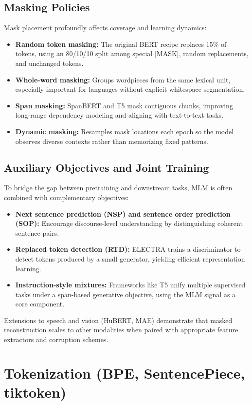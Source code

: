 \documentclass{article}
\begin{document}
\subsection{Masking Policies}
Mask placement profoundly affects coverage and learning dynamics:
\begin{itemize}
  \item \textbf{Random token masking:} The original BERT recipe replaces 15\% of tokens, using an 80/10/10 split among special [MASK], random replacements, and unchanged tokens.
  \item \textbf{Whole-word masking:} Groups wordpieces from the same lexical unit, especially important for languages without explicit whitespace segmentation.
  \item \textbf{Span masking:} SpanBERT and T5 mask contiguous chunks, improving long-range dependency modeling and aligning with text-to-text tasks.
  \item \textbf{Dynamic masking:} Resamples mask locations each epoch so the model observes diverse contexts rather than memorizing fixed patterns.
\end{itemize}

\subsection{Auxiliary Objectives and Joint Training}
To bridge the gap between pretraining and downstream tasks, MLM is often combined with complementary objectives:
\begin{itemize}
  \item \textbf{Next sentence prediction (NSP) and sentence order prediction (SOP):} Encourage discourse-level understanding by distinguishing coherent sentence pairs.
  \item \textbf{Replaced token detection (RTD):} ELECTRA trains a discriminator to detect tokens produced by a small generator, yielding efficient representation learning.
  \item \textbf{Instruction-style mixtures:} Frameworks like T5 unify multiple supervised tasks under a span-based generative objective, using the MLM signal as a core component.
\end{itemize}
Extensions to speech and vision (HuBERT, MAE) demonstrate that masked reconstruction scales to other modalities when paired with appropriate feature extractors and corruption schemes.

\section{Tokenization (BPE, SentencePiece, tiktoken)}
\end{document}
